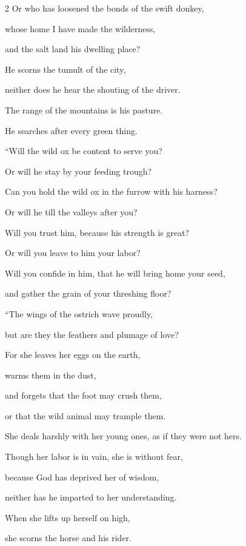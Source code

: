 \begin{multicols}{2}
	Or who has loosened the bonds of the swift donkey,
	
	\myverse{}whose home I have made the wilderness,
	
	and the salt land his dwelling place?
	
	\myverse{}He scorns the tumult of the city,
	
	neither does he hear the shouting of the driver.
	
	\myverse{}The range of the mountains is his pasture.
	
	He searches after every green thing.
	
	\vspace{\baselineskip}

	
	\myverse{}“Will the wild ox be content to serve you?
	
	Or will he stay by your feeding trough?
	
	\myverse{}Can you hold the wild ox in the furrow with his harness?
	
	Or will he till the valleys after you?
	
	\myverse{}Will you trust him, because his strength is great?
	
	Or will you leave to him your labor?
	
	\myverse{}Will you confide in him, that he will bring home your seed,
	
	and gather the grain of your threshing floor?
	
	\vspace{\baselineskip}
	
	\myverse{}“The wings of the ostrich wave proudly,
	
	but are they the feathers and plumage of love?
	
	\myverse{}For she leaves her eggs on the earth,
	
	warms them in the dust,
	
	\myverse{}and forgets that the foot may crush them,
	
	or that the wild animal may trample them.
	
	\myverse{}She deals harshly with her young ones, as if they were not
	hers.
	
	Though her labor is in vain, she is without fear,
	
	\myverse{}because God has deprived her of wisdom,
	
	neither has he imparted to her understanding.
	
	\myverse{}When she lifts up herself on high,
	
	she scorns the horse and his rider.
	

\end{multicols}
